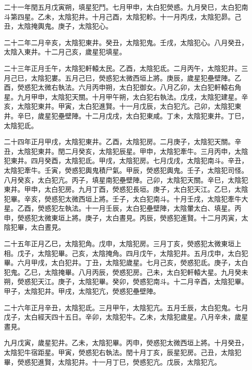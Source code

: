 \begin{pinyinscope}
 二十一年閏五月戊寅朔，填星犯鬥。七月甲申，太白犯熒惑。九月癸巳，太白犯南斗第四星。乙未，太陰犯井。十月己酉，太陰犯軫。十一月丙戌，太陰犯昴。己丑，太陰掩輿鬼。庚子，太陰犯心。



 二十二年二月辛亥，太陰犯東井。癸丑，太陰犯鬼。壬戌，太陰犯心。八月癸丑，太陰入東井。十二月己亥，歲星犯填星。



 二十三年正月壬午，太陰犯軒轅太民。乙酉，太陰犯氐。二月丙午，太陰犯井。三月己巳，太陰犯婁。五月己巳，熒惑犯太微西垣上將。庚辰，歲星犯壘壁陣。乙酉，熒惑犯太微右執法。六月丙申朔，太白犯御女。八月乙卯，太白犯軒轅右角星。九月甲申，太陰犯天關。十月甲午朔，太白犯右執法。戊戌，太陰犯建星。辛亥，太陰犯東井。甲寅，太白犯進賢。十一月戊辰，太白犯亢。己卯，太陰犯東井。辛巳，歲星犯壘壁陣。十二月戊戌，太白犯東咸。丁未，太陰犯東井。丁巳，太陰犯氐。



 二十四年正月甲戌，太陰犯東井。乙酉，太陰犯房。二月庚子，太陰犯天關。辛丑，太陰犯東井。閏二月癸亥，太陰犯辰星。甲申，太陰犯牽牛。三月丙申，太陰犯東井。四月癸酉，太陰犯氐。甲戌，太陰犯房。七月戊戌，太陰犯南斗。辛丑，太陰犯牽牛。壬寅，熒惑犯輿鬼積尸氣。甲辰，熒惑犯輿鬼。壬子，太陰犯司怪。八月癸亥，太白犯亢。丙子，填星南犯壘壁陣。己卯，太陰犯天關。辛巳，太陰犯東井。甲申，太白犯房。九月丁酉，熒惑犯長垣。庚子，太白犯天江。乙巳，太陰犯畢。辛亥，熒惑犯太微西垣上將。壬子，太白犯南斗。十月壬戌，太陰犯牽牛大星。乙酉，熒惑犯左執法。十一月壬辰，太白犯壘壁陣，太陰暈太白、填星。丙申，熒惑犯太微東垣上將。庚子，太白晝見。丙辰，熒惑犯進賢。十二月丙寅，太陰犯畢，太白晝見。



 二十五年正月乙巳，太陰犯角。戊申，太陰犯房。三月丁亥，熒惑犯太微東垣上相。戊子，太陰犯畢。己亥，太陰掩角。四月戊午，太陰犯井。五月戊申，太白犯畢。六月甲戌，太白犯井。丁丑，太陰犯歲星。七月己亥，熒惑犯氐。庚子，太白犯鬼。乙巳，太陰掩畢。八月丙辰，熒惑犯房。己未，太白犯軒轅大星。九月癸未朔，熒惑犯天江。庚子，太陰犯畢。癸卯，熒惑犯南斗。十二月辛酉，太陰犯畢。甲子，太陰犯井。甲戌，太陰犯亢，熒惑犯壘壁陣。



 二十六年正月辛丑，太陰犯氐。三月甲午，太陰犯亢。五月壬辰，太白犯鬼。七月戊子，太白經天四十五日。辛卯，太陰犯牛。乙未，太陰犯歲星。八月辛未，歲星晝見。



 九月戊寅，歲星犯井。乙未，太陰犯畢。丙申，熒惑犯太微西垣上將。十月癸丑，太陰犯牛宿距星。甲寅，熒惑犯右執法。閏十月丁亥，辰星犯房。己丑，太陰犯畢，熒惑犯進賢，太陰犯井。十一月丁巳，熒惑犯亢。戊辰，太陰犯亢。




\end{pinyinscope}

